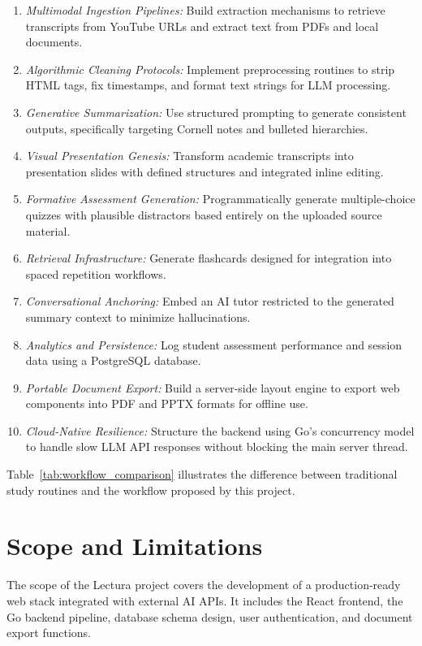 \begin{enumerate}
    \item \textit{Multimodal Ingestion Pipelines:} Build extraction mechanisms to retrieve transcripts from YouTube URLs and extract text from PDFs and local documents.
    \item \textit{Algorithmic Cleaning Protocols:} Implement preprocessing routines to strip HTML tags, fix timestamps, and format text strings for LLM processing.
    \item \textit{Generative Summarization:} Use structured prompting to generate consistent outputs, specifically targeting Cornell notes and bulleted hierarchies.
    \item \textit{Visual Presentation Genesis:} Transform academic transcripts into presentation slides with defined structures and integrated inline editing.
    \item \textit{Formative Assessment Generation:} Programmatically generate multiple-choice quizzes with plausible distractors based entirely on the uploaded source material.
    \item \textit{Retrieval Infrastructure:} Generate flashcards designed for integration into spaced repetition workflows.
    \item \textit{Conversational Anchoring:} Embed an AI tutor restricted to the generated summary context to minimize hallucinations.
    \item \textit{Analytics and Persistence:} Log student assessment performance and session data using a PostgreSQL database.
    \item \textit{Portable Document Export:} Build a server-side layout engine to export web components into PDF and PPTX formats for offline use.
    \item \textit{Cloud-Native Resilience:} Structure the backend using Go’s concurrency model to handle slow LLM API responses without blocking the main server thread.
\end{enumerate}

Table~\ref{tab:workflow_comparison} illustrates the difference between traditional study routines and the workflow proposed by this project.

\section{Scope and Limitations}
The scope of the Lectura project covers the development of a production-ready web stack integrated with external AI APIs. It includes the React frontend, the Go backend pipeline, database schema design, user authentication, and document export functions.

